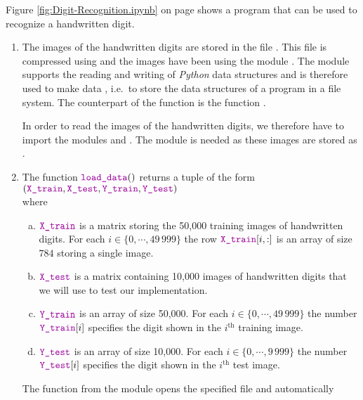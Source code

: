 \noindent
Figure \ref{fig:Digit-Recognition.ipynb} on page \pageref{fig:Digit-Recognition.ipynb} shows a program that can
be used to recognize a handwritten digit.
\begin{enumerate}
\item The images of the handwritten digits are stored in the file .  This file is compressed
      using  and the images have been  using the module
      .  The module
       supports the reading and writing of \textsl{Python} data structures and is therefore
      used to make data , i.e.~to store the data structures of a program in a file system.
      The counterpart of the function  is the function .

      In order to read the images of the handwritten digits, we therefore have to import the modules
       and .  The module  is needed as these images are stored as
       .  
\item The function $\mytt{load\_data}()$ returns a tuple of the form
      \\[0.2cm]
      \hspace*{1.3cm}
      $ \ds (\mytt{X\_train}, \mytt{X\_test}, \mytt{Y\_train}, \mytt{Y\_test}) $
      \\[0.2cm]
      where 
      \begin{enumerate}[(a)]
      \item $\mytt{X\_train}$ is a matrix storing the 50,000 training images of handwritten digits.
            For each $i \in \{0,\cdots,49\,999\}$ the row $\mytt{X\_train}[i, :]$ is an array of size $784$ storing a single image.
      \item $\mytt{X\_test}$ is a matrix containing 10,000 images of handwritten digits that we will use to
            test our implementation.
      \item $\mytt{Y\_train}$ is an array of size 50,000. For each $i \in \{0,\cdots,49\,999\}$ the number $\mytt{Y\_train}[i]$
            specifies the digit shown in the $i^\mathrm{th}$ training image.
      \item $\mytt{Y\_test}$ is an array of size 10,000. For each $i \in \{0,\cdots,9\,999\}$ the number $\mytt{Y\_test}[i]$
            specifies the digit shown in the $i^{\mathrm{th}}$ test image.
      \end{enumerate}
      The function  from the module  opens the specified file and automatically

\end{enumerate}
